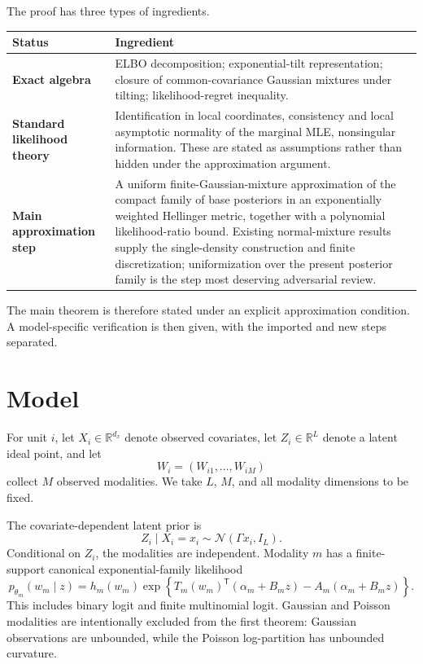\documentclass[11pt]{article}
\theoremstyle{definition}
\newcommand{\R}{\mathbb R}
\newcommand{\trans}{\mathsf T}
\newcommand{\cN}{\mathcal N}
\begin{document}
The proof has three types of ingredients.

\begin{center}
\begin{tabularx}{0.96\textwidth}{>{\bfseries}p{}X}
\toprule
Status & Ingredient \\
\midrule
Exact algebra & ELBO decomposition; exponential-tilt representation; closure of common-covariance Gaussian mixtures under tilting; likelihood-regret inequality. \\
Standard likelihood theory & Identification in local coordinates, consistency and local asymptotic normality of the marginal MLE, nonsingular information. These are stated as assumptions rather than hidden under the approximation argument. \\
Main approximation step & A uniform finite-Gaussian-mixture approximation of the compact family of base posteriors in an exponentially weighted Hellinger metric, together with a polynomial likelihood-ratio bound. Existing normal-mixture results supply the single-density construction and finite discretization; uniformization over the present posterior family is the step most deserving adversarial review. \\
\bottomrule
\end{tabularx}
\end{center}

The main theorem is therefore stated under an explicit approximation condition. A model-specific verification is then given, with the imported and new steps separated.

\section{Model}
\label{sec:model}

For unit $i$, let $X_i\in\R^{d_x}$ denote observed covariates, let $Z_i\in\R^L$ denote a latent ideal point, and let
\[
W_i=(W_{i1},\ldots,W_{iM})
\]
collect $M$ observed modalities. We take $L$, $M$, and all modality dimensions to be fixed.

The covariate-dependent latent prior is
\begin{equation}
Z_i\mid X_i=x_i\sim\cN(\Gamma x_i,I_L).
\label{eq:prior}
\end{equation}
Conditional on $Z_i$, the modalities are independent. Modality $m$ has a finite-support canonical exponential-family likelihood
\begin{equation}
p_{\theta_m}(w_m\mid z)
=
 h_m(w_m)
\exp\!\left\{
T_m(w_m)^{\trans}(\alpha_m+B_m z)
-A_m(\alpha_m+B_m z)
\right\}.
\label{eq:expfam}
\end{equation}
This includes binary logit and finite multinomial logit. Gaussian and Poisson modalities are intentionally excluded from the first theorem: Gaussian observations are unbounded, while the Poisson log-partition has unbounded curvature.
\end{document}

